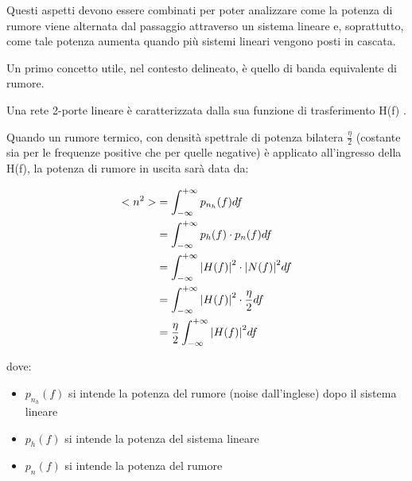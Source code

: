 Questi aspetti devono essere combinati per poter analizzare come la potenza di rumore viene alternata dal passaggio attraverso un sistema lineare 
e, soprattutto, come tale potenza aumenta quando più sistemi lineari vengono posti in cascata. \newline 

Un primo concetto utile, nel contesto delineato, è quello di banda equivalente di rumore. \newline 

Una rete 2-porte lineare è caratterizzata dalla sua funzione di trasferimento H(f) . \newline 

Quando un rumore termico, con densità spettrale di potenza bilatera $\frac{\eta}{2}$ (costante sia per le frequenze positive che per quelle negative) è applicato all'ingresso della H(f), 
la potenza di rumore in uscita sarà data da: 

{
    \Large 
    \begin{equation}
        \begin{split}
            <n^{2}>
            &= 
            \int_{-\infty}^{+\infty}
            p_{n_h}(f) 
            df
            \\
            &= 
            \int_{-\infty}^{+\infty}
            p_h(f) \cdot p_n(f) 
            df
            \\
            &= 
            \int_{-\infty}^{+\infty}
            \abs{H(f)}^{2} \cdot \abs{N(f)}^{2}
            df
            \\
            &= 
            \int_{-\infty}^{+\infty}
            \abs{H(f)}^{2} \cdot \frac{\eta}{2}
            df
            \\
            &=
            \frac{\eta}{2}
             \int_{-\infty}^{+\infty}
            \abs{H(f)}^{2} 
            df
        \end{split}
    \end{equation}
}

dove: 

\begin{itemize}
    \item $p_{n_h}(f)$ si intende la potenza del rumore (noise dall'inglese) dopo il sistema lineare 
    \item $p_h (f)$ si intende la potenza del sistema lineare 
    \item $p_n (f)$ si intende la potenza del rumore 
\end{itemize}  

\newpage 

